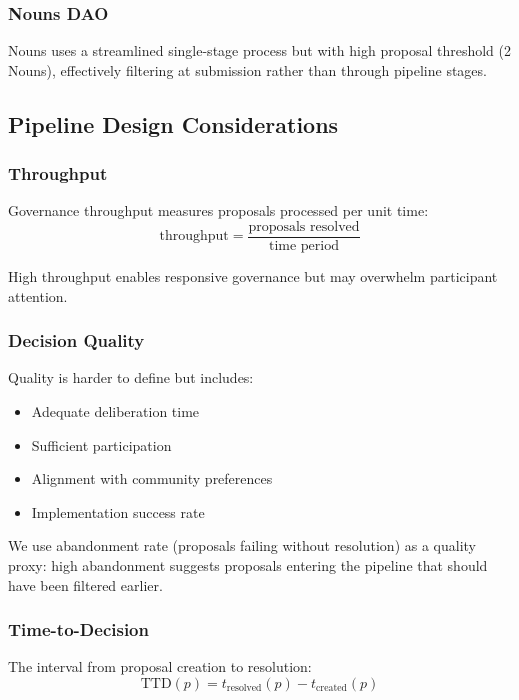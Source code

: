 \subsubsection{Nouns DAO}

Nouns uses a streamlined single-stage process but with high proposal threshold (2 Nouns), effectively filtering at submission rather than through pipeline stages.

\subsection{Pipeline Design Considerations}

\subsubsection{Throughput}

Governance throughput measures proposals processed per unit time:
\begin{equation}
\text{throughput} = \frac{\text{proposals resolved}}{\text{time period}}
\end{equation}

High throughput enables responsive governance but may overwhelm participant attention.

\subsubsection{Decision Quality}

Quality is harder to define but includes:
\begin{itemize}
    \item Adequate deliberation time
    \item Sufficient participation
    \item Alignment with community preferences
    \item Implementation success rate
\end{itemize}

We use abandonment rate (proposals failing without resolution) as a quality proxy: high abandonment suggests proposals entering the pipeline that should have been filtered earlier.

\subsubsection{Time-to-Decision}

The interval from proposal creation to resolution:
\begin{equation}
\text{TTD}(p) = t_{\text{resolved}}(p) - t_{\text{created}}(p)
\end{equation}

